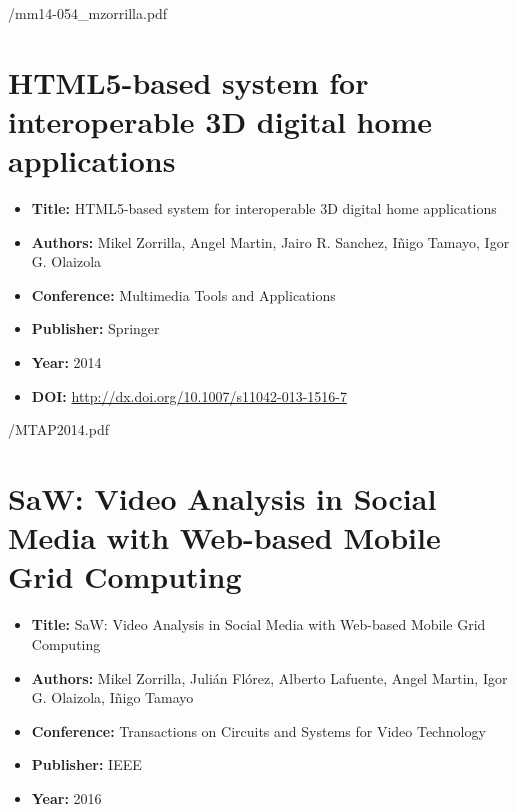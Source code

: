 \ifattachpapers
	 {\PublicationsPath/mm14-054_mzorrilla.pdf}
\fi


\chapter[HTML5-based system for interoperable 3D applications]{HTML5-based system for interoperable 3D digital home applications}
\label{chap:MTAP2014}
\begin{itemize} \itemsep1pt\parskip0pt
	\item \textbf{Title:} HTML5-based system for interoperable 3D digital home applications
	\item \textbf{Authors:} Mikel Zorrilla, Angel Martin, Jairo R. Sanchez, Iñigo Tamayo, Igor G. Olaizola	
	\item \textbf{Conference:} Multimedia Tools and Applications
 	\item \textbf{Publisher:} Springer
	\item \textbf{Year:} 2014
	\item \textbf{DOI:}  \url{http://dx.doi.org/10.1007/s11042-013-1516-7}
\end{itemize}	
	

\ifattachpapers
	 {\PublicationsPath/MTAP2014.pdf}
\fi


\chapter[SaW: Video Analysis with Web-based Mobile Grid Computing]{SaW: Video Analysis in Social Media with Web-based Mobile Grid Computing}
\label{chap:TCSVT2016}
\begin{itemize} \itemsep1pt\parskip0pt
	\item \textbf{Title:} SaW: Video Analysis in Social Media with Web-based Mobile Grid Computing
	\item \textbf{Authors:} Mikel Zorrilla, Julián Flórez, Alberto Lafuente, Angel Martin, Igor G. Olaizola, Iñigo Tamayo	
	\item \textbf{Conference:} Transactions on Circuits and Systems for Video Technology
 	\item \textbf{Publisher:} IEEE
	\item \textbf{Year:} 2016
\end{itemize}	
	

